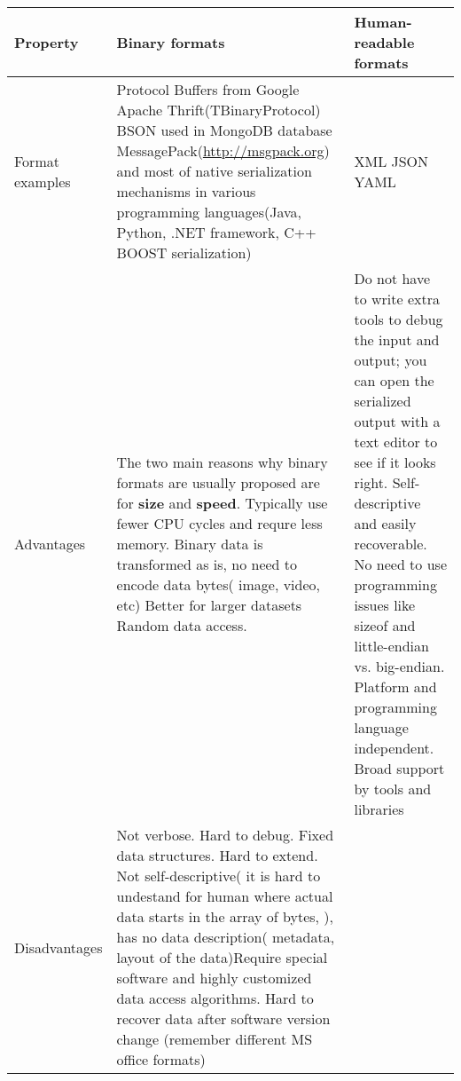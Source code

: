 \begin{table}[h]
	\centering	
	\begin{tabularx}{\textwidth}{|X|X|X|}
		\hline
		\textbf{Property} & 
		\textbf{Binary formats}  	& 
		\textbf{Human-readable formats}	
	    
	    \tabularnewline
		\hline
		Format examples &
		Protocol Buffers from Google \newline 
		{Apache Thrift(TBinaryProtocol)} \newline
		BSON used in MongoDB database \newline
		MessagePack(\url{http://msgpack.org})\newline
		and most of native serialization
		mechanisms in various programming languages(Java, Python, .NET framework,
		C++ BOOST serialization) &
		\gls{XML} \newline \gls{JSON} \newline \gls{YAML}
	
	    \tabularnewline
		\hline	  
		
		Advantages & 
		The two main reasons why binary formats are usually proposed
		are for \textbf{size} and \textbf{speed}. \newline
		Typically use fewer CPU cycles and requre less memory.
		Binary data is transformed as is, no need to encode data bytes( image, video,
		etc)
		Better for larger datasets \newline
		Random data access.
		

		
		&
		
		Do not have to write extra tools to debug the input and output; you can open
		the serialized output with a text editor to see if it looks right. \newline
		Self-descriptive and easily recoverable. \newline
		No need to use programming issues like sizeof and little-endian vs.
		big-endian. \newline
		Platform and programming language independent. \newline
		Broad support by tools and libraries \newline
		
		
		
		
		\tabularnewline
		\hline
		Disadvantages &
		Not verbose. Hard to debug. \newline
		Fixed data structures. Hard to extend. \newline
		Not self-descriptive( it is hard to undestand for human where actual data
		starts in the array of bytes, ), has no data description( metadata, layout
		of the data)\newline Require special software and  highly customized data
		access algorithms.
		Hard to recover data after software version change (remember different MS
		office formats)
				

\end{tabularx}
\end{table}
